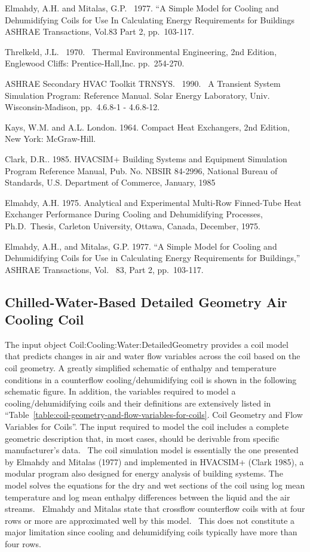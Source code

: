 Elmahdy, A.H. and Mitalas, G.P.~ 1977. ``A Simple Model for Cooling and Dehumidifying Coils for Use In Calculating Energy Requirements for Buildings ASHRAE Transactions, Vol.83 Part 2, pp.~103-117.

Threlkeld, J.L.~ 1970.~ Thermal Environmental Engineering, 2nd Edition, Englewood Cliffs: Prentice-Hall,Inc. pp.~254-270.

ASHRAE Secondary HVAC Toolkit TRNSYS.~ 1990.~ A Transient System Simulation Program: Reference Manual. Solar Energy Laboratory, Univ. Wisconsin-Madison, pp.~4.6.8-1 - 4.6.8-12.

Kays, W.M. and A.L. London. 1964. Compact Heat Exchangers, 2nd Edition, New York: McGraw-Hill.

Clark, D.R.. 1985. HVACSIM+ Building Systems and Equipment Simulation Program Reference Manual, Pub. No. NBSIR 84-2996, National Bureau of Standards, U.S. Department of Commerce, January, 1985

Elmahdy, A.H. 1975. Analytical and Experimental Multi-Row Finned-Tube Heat Exchanger Performance During Cooling and Dehumidifying Processes, Ph.D.~Thesis, Carleton University, Ottawa, Canada, December, 1975.

Elmahdy, A.H., and Mitalas, G.P. 1977. ``A Simple Model for Cooling and Dehumidifying Coils for Use in Calculating Energy Requirements for Buildings,'' ASHRAE Transactions, Vol.~ 83, Part 2, pp.~103-117.

\subsection{Chilled-Water-Based Detailed Geometry Air Cooling Coil}\label{chilled-water-based-detailed-geometry-air-cooling-coil}

The input object Coil:Cooling:Water:DetailedGeometry provides a coil model that predicts changes in air and water flow variables across the coil based on the coil geometry. A greatly simplified schematic of enthalpy and temperature conditions in a counterflow cooling/dehumidifying coil is shown in the following schematic figure. In addition, the variables required to model a cooling/dehumidifying coils and their definitions are extensively listed in ``Table~\ref{table:coil-geometry-and-flow-variables-for-coils}. Coil Geometry and Flow Variables for Coils''. The input required to model the coil includes a complete geometric description that, in most cases, should be derivable from specific manufacturer's data.~ The coil simulation model is essentially the one presented by Elmahdy and Mitalas (1977) and implemented in HVACSIM+ (Clark 1985), a modular program also designed for energy analysis of building systems. The model solves the equations for the dry and wet sections of the coil using log mean temperature and log mean enthalpy differences between the liquid and the air streams.~ Elmahdy and Mitalas state that crossflow counterflow coils with at four rows or more are approximated well by this model.~ This does not constitute a major limitation since cooling and dehumidifying coils typically have more than four rows.

